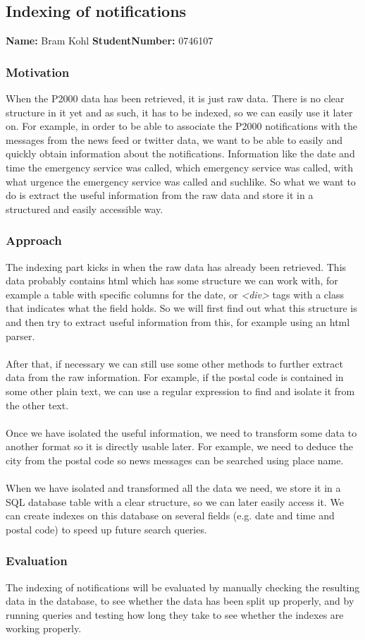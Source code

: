 \subsection{Indexing of notifications}
\textbf{Name:} Bram Kohl \indent \textbf{StudentNumber:} 0746107

\subsubsection*{Motivation}
When the P2000 data has been retrieved, it is just raw data. There is no clear structure in it yet and as such, it has to be indexed, so we can easily use it later on. For example, in order to be able to associate the P2000 notifications with the messages from the news feed or twitter data, we want to be able to easily and quickly obtain information about the notifications. Information like the date and time the emergency service was called, which emergency service was called, with what urgence the emergency service was called and suchlike. So what we want to do is extract the useful information from the raw data and store it in a structured and easily accessible way.
\subsubsection*{Approach}
The indexing part kicks in when the raw data has already been retrieved. This data probably contains html which has some structure we can work with,  for example a table with specific columns for the date, or \textit{\textless div\textgreater} tags with a class that indicates what the field holds. So we will first find out what this structure is and then try to extract useful information from this, for example using an html parser.\\\\
After that, if necessary we can still use some other methods to further extract data from the raw information. For example, if the postal code is contained in some other plain text, we can use a regular expression to find and isolate it from the other text.\\\\
Once we have isolated the useful information, we need to transform some data to another format so it is directly usable later. For example, we need to deduce the city from the postal code so news messages can be searched using place name.\\\\
When we have isolated and transformed all the data we need, we store it in a SQL database table with a clear structure, so we can later easily access it. We can create indexes on this database on several fields (e.g. date and time and postal code) to speed up future search queries.
\subsubsection*{Evaluation}
The indexing of notifications will be evaluated by manually checking the resulting data in the database, to see whether the data has been split up properly, and by running queries and testing how long they take to see whether the indexes are working properly.